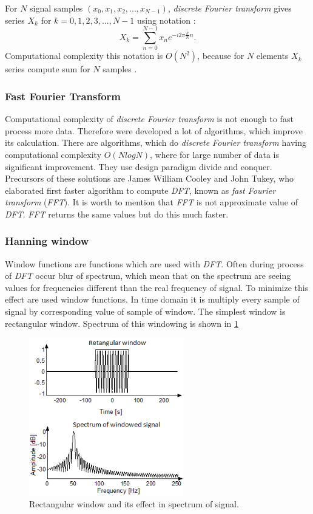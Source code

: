 \documentclass[11pt,titlepage]{article}
\theoremstyle{plain}
\begin{document}
For $N$ signal samples $(x_0,x_1,x_2,...,x_{N-1})$, \textit{discrete Fourier transform} gives series $X_k$ for $k = 0,1, 2, 3, ..., N-1$ using notation \cite{fourier}:
\begin{equation}
	X_k =  \sum\limits_{n=0}^{N-1} x_ne^{-i2\pi \frac{k}{N}n}.
\end{equation}
Computational complexity this notation is $O(N^2)$, because for $N$ elements $X_k$ series compute sum for $N$ samples \cite{fast_fourier}.

\subsubsection{Fast Fourier Transform}
Computational complexity of \textit{discrete Fourier transform} is not enough to fast process more data. Therefore were developed a lot of algorithms, which improve its calculation. There are algorithms, which do \textit{discrete Fourier transform} having computational complexity $O(NlogN)$, where for large number of data is significant improvement. They use design paradigm divide and conquer. Precursors of these solutions are James William Cooley and John Tukey, who elaborated first faster algorithm to compute \textit{DFT}, known as \textit{fast Fourier transform} (\textit{FFT}). It is worth to mention that \textit{FFT} is not approximate value of \textit{DFT}. \textit{FFT} returns the same values but do this much faster.

\subsubsection{Hanning window}
Window functions are functions which are used with \textit{DFT}. Often during process of \textit{DFT} occur blur of spectrum, which mean that on the spectrum are seeing values for frequencies different than the real frequency of signal. To minimize this effect are used window functions. In time domain it is multiply every sample of signal by corresponding value of sample of window. The simplest window is rectangular window. Spectrum of this windowing is shown in \ref{fig:F9}
\begin{figure}[H]
	\centering
	\includegraphics[width=0.6\textwidth]{img/rectangular_window}
	\caption{Rectangular window and its effect in spectrum of signal.}
	\label{fig:F9}
\end{figure}
\end{document}
